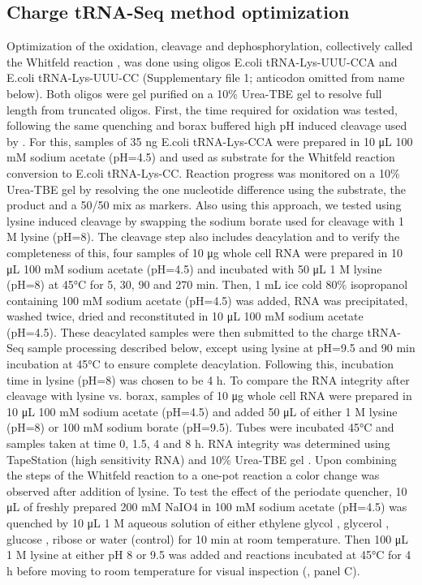 \documentclass[9pt,lineno]{elife}
\begin{document}
\subsection{Charge tRNA-Seq method optimization}
Optimization of the oxidation, cleavage and dephosphorylation, collectively called the Whitfeld reaction \cite{Whitfeld1953-ca}, was done using oligos E.coli tRNA-Lys-UUU-CCA and E.coli tRNA-Lys-UUU-CC (Supplementary file 1; anticodon omitted from name below).
Both oligos were gel purified on a 10\% Urea-TBE gel to resolve full length from truncated oligos.
First, the time required for oxidation was tested, following the same quenching and borax buffered high pH induced cleavage used by \cite{Evans2017-st}.
For this, samples of 35 ng E.coli tRNA-Lys-CCA were prepared in 10 μL 100 mM sodium acetate (pH=4.5) and used as substrate for the Whitfeld reaction conversion to E.coli tRNA-Lys-CC.
Reaction progress was monitored on a 10\% Urea-TBE gel by resolving the one nucleotide difference using the substrate, the product and a 50/50 mix as markers.
Also using this approach, we tested using lysine induced cleavage \citep{Khym1961-xf} by swapping the sodium borate used for cleavage with 1 M lysine (pH=8).
The cleavage step also includes deacylation and to verify the completeness of this, four samples of 10 μg whole cell RNA were prepared in 10 μL 100 mM sodium acetate (pH=4.5) and incubated with 50 μL 1 M lysine (pH=8) at 45°C for 5, 30, 90 and 270 min.
Then, 1 mL ice cold 80\% isopropanol containing 100 mM sodium acetate (pH=4.5) was added, RNA was precipitated, washed twice, dried and reconstituted in 10 μL 100 mM sodium acetate (pH=4.5).
These deacylated samples were then submitted to the charge tRNA-Seq sample processing described below, except using lysine at pH=9.5 and 90 min incubation at 45°C to ensure complete deacylation.
Following this, incubation time in lysine (pH=8) was chosen to be 4 h.
To compare the RNA integrity after cleavage with lysine vs. borax, samples of 10 μg whole cell RNA were prepared in 10 μL 100 mM sodium acetate (pH=4.5) and added 50 μL of either 1 M lysine (pH=8) or 100 mM sodium borate (pH=9.5).
Tubes were incubated 45°C and samples taken at time 0, 1.5, 4 and 8 h.
RNA integrity was determined using TapeStation (high sensitivity RNA) and 10\% Urea-TBE gel .
Upon combining the steps of the Whitfeld reaction to a one-pot reaction a color change was observed after addition of lysine.
To test the effect of the periodate quencher, 10 μL of freshly prepared 200 mM NaIO4 in 100 mM sodium acetate (pH=4.5) was quenched by 10 μL 1 M aqueous solution of either 
ethylene glycol \citep{Neu1964-hu}, glycerol \citep{Alefelder1998-ln}, glucose \citep{Evans2017-st}, ribose \citep{Watkins2022-er} or water (control) for 10 min at room temperature.
Then 100 μL 1 M lysine at either pH 8 or 9.5 was added and reactions incubated at 45°C for 4 h before moving to room temperature for visual inspection (, panel C).
\end{document}

